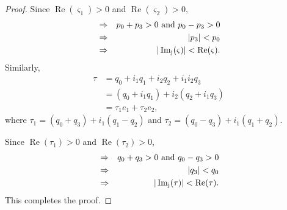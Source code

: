 \documentclass[a4paper,12pt]{article}
\theoremstyle{remark}
\begin{document}
\begin{proof}
\noindent Since
$\operatorname{Re}( \varsigma_1)>0$ and  $\operatorname{Re}( \varsigma_2)  >0,$
		\begin{eqnarray}
		&\Rightarrow & p_0+p_3 >0 ~\text{and}~ p_0-p_3 >0 \notag\\
		&	\Rightarrow& ~ |p_3|<p_0 \notag\\
		&\Rightarrow&|\operatorname{Im_j}( \varsigma)|<\operatorname{Re}( \varsigma).\label{eq:re(alpha)g0}
		\end{eqnarray}
		Similarly,	
		\begin{equation}
		\begin{split}
		\tau&= q_0+i_1q_1+ i_2q_2+i_1i_2q_3\\
		&=(q_0+i_1q_1) +i_2( q_2+i_1q_3)\\
		&=\tau_1e_1+\tau_2e_2,
		\end{split}
		\end{equation}
		where $\tau_1= (q_0+q_3) +i_1(q_1-q_2)$ and $\tau_2= (q_0-q_3) +i_1(q_1+q_2).$
		
\noindent 		Since
		$\operatorname{Re}(\tau_1)>0$ and  $\operatorname{Re}(\tau_2)  >0$,
		\begin{eqnarray}
		&\Rightarrow & q_0+q_3 >0 ~\text{and}~ q_0-q_3 >0 \notag\\
		&	\Rightarrow& ~ |q_3|<q_0 \notag \\
		&\Rightarrow&|\operatorname{Im_j}(\tau)|<\operatorname{Re}(\tau). \label{eq:re(alpha)g01}
		\end{eqnarray}
This completes the proof.		
	\end{proof}

\end{document}
